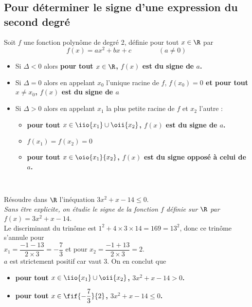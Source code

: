 \documentclass[a4paper,11pt,cours]{nsi}
\begin{document}
\subsection{Pour déterminer le signe d'une expression du second degré}
\begin{propriete}
	Soit $f$ une fonction polynôme de degré 2, définie pour tout $x\in\R$ par
	$$f(x)=ax^2+bx+c\qquad\qquad(a\neq 0)$$
	\begin{itemize}
		\item	Si $\Delta<0$ alors \textbf{\boldmath pour tout $x\in\R$, $f(x)$ est du signe de $a$.}
		\item 	Si $\Delta=0$ alors en appelant $x_0$ l'unique racine de $f$, \textbf{\boldmath $f(x_0)=0$ et pour tout $x\neq x_0$, $f(x)$ est 
			du 
			signe de $a$}
		\item 	Si $\Delta>0$ alors en appelant $x_1$ la plus petite racine de $f$ et $x_2$ l'autre :
		\begin{itemize}
			\item 	\textbf{\boldmath pour tout $x\in\iio{x_1}\cup\oii{x_2}$, $f(x)$ est du signe de $a$.}
			\item 	{\boldmath $f(x_1)=f(x_2)=0$}
			\item 	\textbf{\boldmath pour tout $x\in\oio{x_1}{x_2}$, $f(x)$ est du signe opposé à celui de $a$.}
		\end{itemize}
	\end{itemize}
\end{propriete}	


\begin{demonstration}
	\\

\end{demonstration}	



\begin{exemple}
	Résoudre dans $\R$ l'inéquation $3x^2+x-14\leqslant 0$.\\
	
	\emph{Sans être explicite, on étudie le signe de la fonction $f$ définie sur $\R$ par $f(x)=3x^2+x-14$.}\\
	Le discriminant du trinôme est $1^2+4\times 3\times 14=169=13^2$, donc ce trinôme s'annule pour \\
	
	$x_1=\dfrac{-1-13}{2\times3}=-\dfrac{7}{3}$ 
	et pour $x_2=\dfrac{-1+13}{2\times3}=2$.\\
	
	$a$ est strictement positif car vaut 3. On en conclut que 
	\begin{itemize}
		\item 	\textbf{\boldmath pour tout $x\in\iio{x_1}\cup\oii{x_2}$, $3x^2+x-14>0$.}
		
		\item 	\textbf{\boldmath pour tout $x\in\fif{-\dfrac{7}{3}}{2}$, $3x^2+x-14\leqslant 0$.}
	\end{itemize}	
\end{exemple}
\end{document}
